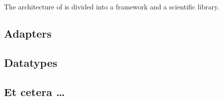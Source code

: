 
The architecture of \TVB is divided into a framework and a 
scientific library. 

\subsection{Adapters}

\subsection{Datatypes}

\subsection{Et cetera \dots}


